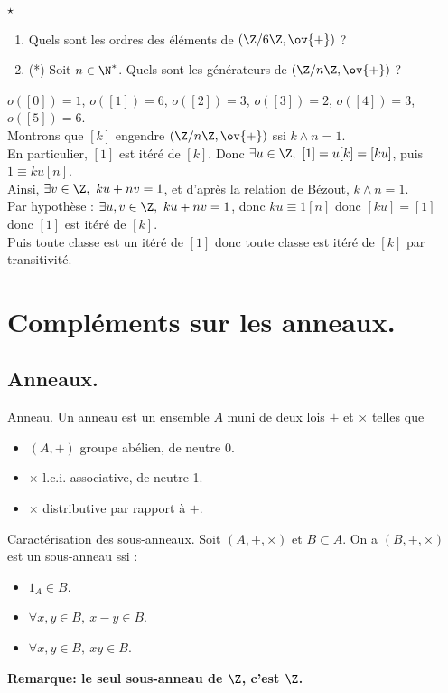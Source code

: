 \documentclass[11pt]{article}
\begin{document}
\vspace*{-0.8cm}

\begin{ex}{$\star$}{}
    \begin{enumerate}
        \item Quels sont les ordres des éléments de $(\Z/6\Z,\ov{+})$ ?
        \item (*) Soit $n\in\N^*$. Quels sont les générateurs de $(\Z/n\Z,\ov{+})$ ?
    \end{enumerate} 
    \tcblower
     $o([0])=1$, $o([1])=6$, $o([2])=3$, $o([3])=2$, $o([4])=3$, $o([5])=6$.\\
     Montrons que $[k]$ engendre $(\Z/n\Z,\ov{+})$ ssi $k\land n=1$.\\
    \boxed{\ra} En particulier, $[1]$ est itéré de $[k]$. Donc $\exists u\in\Z, ~ [1]=u[k]=[ku]$, puis $1\equiv ku[n]$.\\
    Ainsi, $\exists v \in \Z, ~ ku+nv=1$, et d'après la relation de Bézout, $k\land n=1$.\\
    \boxed{\la} Par hypothèse : $\exists u,v \in \Z, ~ ku+nv=1$, donc $ku\equiv 1[n]$ donc $[ku]=[1]$ donc $[1]$ est itéré de $[k]$.\\
    Puis toute classe est un itéré de $[1]$ donc toute classe est itéré de $[k]$ par transitivité.
\end{ex}

\section{Compléments sur les anneaux.}

\subsection{Anneaux.}

\begin{rappel}{Anneau.}{}
    Un anneau est un ensemble $A$ muni de deux lois $+$ et $\times$ telles que
    \begin{itemize}
        \item $(A,+)$ groupe abélien, de neutre $0$.
        \item $\times$ l.c.i. associative, de neutre 1.
        \item $\times$ distributive par rapport à $+$.
    \end{itemize}
\end{rappel}

\begin{rappel}{Caractérisation des sous-anneaux.}{}
    Soit $(A,+,\times)$ et $B\subset A$. On a $(B,+,\times)$ est un sous-anneau ssi :
    \begin{itemize}
        \item $1_A\in B$.
        \item $\forall x,y \in B, ~ x-y\in B$.
        \item $\forall x,y \in B, ~ xy\in B$.
    \end{itemize}
    \bf{Remarque:} le seul sous-anneau de $\Z$, c'est $\Z$.
\end{rappel}
\end{document}

